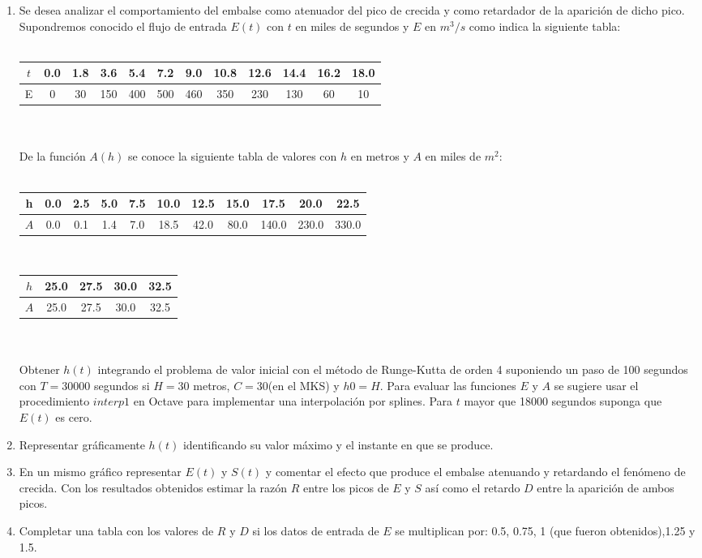 \documentclass{article}
\begin{document}
 \begin{enumerate}
\item Se desea analizar el comportamiento del embalse como atenuador del pico de crecida y como retardador de la aparici\'on de dicho pico. Supondremos conocido el flujo de entrada $E(t)$ con $t$ en miles de segundos y $E$ en $m^3/s$ como indica la siguiente tabla:\\\\
 \begin{tabular}{|c|c|c|c|c|c|c|c|c|c|c|c|}
\hline
$t$& 0.0 &  1.8 & 3.6 & 5.4 & 7.2 & 9.0 & 10.8 & 12.6 & 14.4 & 16.2 & 18.0\\ \hline
E &  0 & 30 & 150 & 400 & 500 & 460 & 350 & 230 & 130 & 60 & 10\\ \hline
\end{tabular}\\
\\De la funci\'on $A(h)$ se conoce la siguiente tabla de valores con $h$ en metros y $A$ en miles de $m^2$:\\\\
\begin{tabular}{|c|c|c|c|c|c|c|c|c|c|c|}
\hline
h & 0.0 &  2.5 & 5.0 & 7.5 & 10.0 & 12.5 & 15.0 & 17.5 & 20.0 & 22.5 \\ \hline
$A$ &  0.0 & 0.1 & 1.4 & 7.0 & 18.5 & 42.0 & 80.0 & 140.0 & 230.0 & 330.0 \\ \hline
\end{tabular}\\
\begin{tabular}{|c|c|c|c|c|}
\hline
$h$& 25.0 & 27.5 & 30.0 & 32.5\\ \hline
$A$& 25.0 & 27.5 & 30.0 & 32.5\\ \hline
\end{tabular}\\
\\Obtener $h(t)$ integrando el problema de valor inicial con el m\'etodo de Runge-Kutta de orden 4 suponiendo un paso de 100 segundos con $T = 30000$ segundos si $H = 30$ metros, $C=30$(en el MKS) y $h0 =H$. Para evaluar las funciones $E$ y $A$ se sugiere usar el procedimiento $interp1$ en Octave para implementar una interpolaci\'on por splines. Para $t$ mayor que 18000 segundos suponga que $E(t)$ es cero.\\
 
\item Representar gr\'aficamente $h(t)$ identificando su valor m\'aximo y el instante en que se produce.\\
\item En un mismo gr\'afico representar $E(t)$ y $S(t)$ y comentar el efecto que produce el embalse atenuando y retardando el fen\'omeno de crecida. Con los resultados obtenidos estimar la raz\'on $R$ entre los picos de $E$ y $S$ as\'i como el retardo $D$ entre la aparici\'on de ambos picos.\\
 
\item Completar una tabla con los valores de $R$ y $D$ si los datos de entrada de $E$ se multiplican por: 0.5, 0.75, 1 (que fueron obtenidos),1.25 y 1.5.\\
 \end{enumerate}
 \newpage
\end{document}
